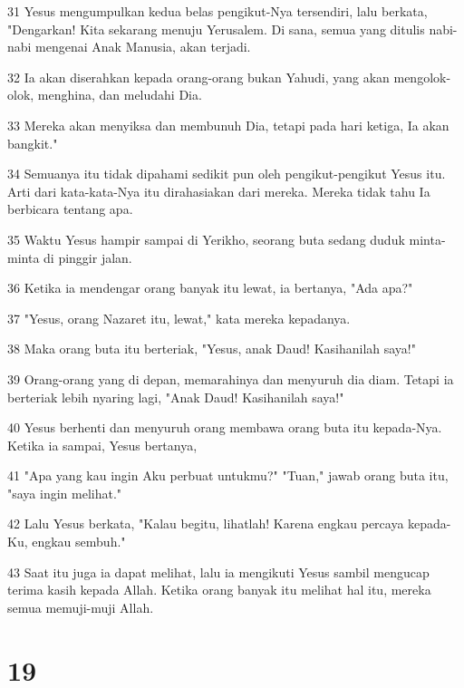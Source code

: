 \par 31 Yesus mengumpulkan kedua belas pengikut-Nya tersendiri, lalu berkata, "Dengarkan! Kita sekarang menuju Yerusalem. Di sana, semua yang ditulis nabi-nabi mengenai Anak Manusia, akan terjadi.
\par 32 Ia akan diserahkan kepada orang-orang bukan Yahudi, yang akan mengolok-olok, menghina, dan meludahi Dia.
\par 33 Mereka akan menyiksa dan membunuh Dia, tetapi pada hari ketiga, Ia akan bangkit."
\par 34 Semuanya itu tidak dipahami sedikit pun oleh pengikut-pengikut Yesus itu. Arti dari kata-kata-Nya itu dirahasiakan dari mereka. Mereka tidak tahu Ia berbicara tentang apa.
\par 35 Waktu Yesus hampir sampai di Yerikho, seorang buta sedang duduk minta-minta di pinggir jalan.
\par 36 Ketika ia mendengar orang banyak itu lewat, ia bertanya, "Ada apa?"
\par 37 "Yesus, orang Nazaret itu, lewat," kata mereka kepadanya.
\par 38 Maka orang buta itu berteriak, "Yesus, anak Daud! Kasihanilah saya!"
\par 39 Orang-orang yang di depan, memarahinya dan menyuruh dia diam. Tetapi ia berteriak lebih nyaring lagi, "Anak Daud! Kasihanilah saya!"
\par 40 Yesus berhenti dan menyuruh orang membawa orang buta itu kepada-Nya. Ketika ia sampai, Yesus bertanya,
\par 41 "Apa yang kau ingin Aku perbuat untukmu?" "Tuan," jawab orang buta itu, "saya ingin melihat."
\par 42 Lalu Yesus berkata, "Kalau begitu, lihatlah! Karena engkau percaya kepada-Ku, engkau sembuh."
\par 43 Saat itu juga ia dapat melihat, lalu ia mengikuti Yesus sambil mengucap terima kasih kepada Allah. Ketika orang banyak itu melihat hal itu, mereka semua memuji-muji Allah.

\chapter{19}

